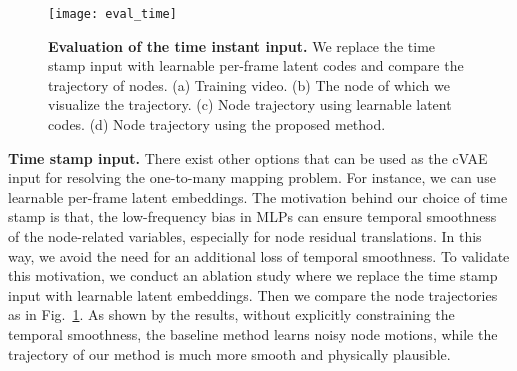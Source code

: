 \begin{figure}
    \centering
    \texttt{[image: eval\_time]}
    \caption{\textbf{Evaluation of the time instant input.} We replace the time stamp input with learnable per-frame latent codes and compare the trajectory of nodes. (a) Training video. (b) The node of which we visualize the trajectory. (c) Node trajectory using learnable latent codes. (d) Node trajectory using the proposed method. }
    \label{fig:eval_time}
\end{figure}



\noindent\textbf{Time stamp input. }
There exist other options that can be used as the cVAE input for resolving the one-to-many mapping problem. For instance, we can use learnable per-frame latent embeddings. The motivation behind our choice of time stamp is that, the low-frequency bias in MLPs can ensure temporal smoothness of the node-related variables, especially for node residual translations. In this way, we avoid the need for an additional loss of temporal smoothness. To validate this motivation, we conduct an ablation study where we replace the time stamp input with learnable latent embeddings. Then we compare the node trajectories as in Fig.~\ref{fig:eval_time}. As shown by the results, without explicitly constraining the temporal smoothness, the baseline method learns noisy node motions, while the trajectory of our method is much more smooth and physically plausible. 


